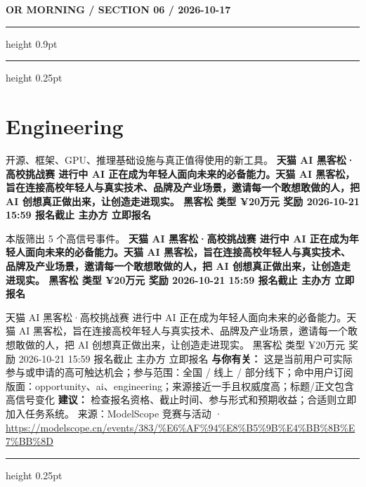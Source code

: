 \documentclass[10.5pt]{ctexart}
\begin{document}
\newpage
{\small\bfseries OR MORNING / SECTION 06 / 2026-10-17}
\vspace{2mm}
\hrule height 0.9pt
\vspace{1.5mm}
\hrule height 0.25pt
\vspace{4mm}
\section*{Engineering}
{\color{ormuted} 开源、框架、GPU、推理基础设施与真正值得使用的新工具。}
\vspace{2mm}
{\LARGE\bfseries 天猫 AI 黑客松·高校挑战赛 进行中 AI 正在成为年轻人面向未来的必备能力。天猫 AI 黑客松，旨在连接高校年轻人与真实技术、品牌及产业场景，邀请每一个敢想敢做的人，把 AI 创想真正做出来，让创造走进现实。 黑客松 类型 ¥20万元 奖励 2026-10-21 15:59 报名截止 主办方 立即报名}\par
\vspace{1mm}
{\color{ormuted} 本版筛出 5 个高信号事件。}
\vspace{3mm}
{\Large\bfseries 天猫 AI 黑客松·高校挑战赛 进行中 AI 正在成为年轻人面向未来的必备能力。天猫 AI 黑客松，旨在连接高校年轻人与真实技术、品牌及产业场景，邀请每一个敢想敢做的人，把 AI 创想真正做出来，让创造走进现实。 黑客松 类型 ¥20万元 奖励 2026-10-21 15:59 报名截止 主办方 立即报名}\par
天猫 AI 黑客松·高校挑战赛 进行中 AI 正在成为年轻人面向未来的必备能力。天猫 AI 黑客松，旨在连接高校年轻人与真实技术、品牌及产业场景，邀请每一个敢想敢做的人，把 AI 创想真正做出来，让创造走进现实。 黑客松 类型 ¥20万元 奖励 2026-10-21 15:59 报名截止 主办方 立即报名
\textbf{与你有关：} 这是当前用户可实际参与或申请的高可触达机会；参与范围：全国 / 线上 / 部分线下；命中用户订阅版面：opportunity、ai、engineering；来源接近一手且权威度高；标题/正文包含高信号变化
\textbf{建议：} 检查报名资格、截止时间、参与形式和预期收益；合适则立即加入任务系统。
{\footnotesize\color{ormuted} 来源：ModelScope 竞赛与活动 · \url{https://modelscope.cn/events/383/%E6%AF%94%E8%B5%9B%E4%BB%8B%E7%BB%8D}}
\vspace{4mm}
\hrule height 0.25pt
\vspace{3mm}
\end{document}
